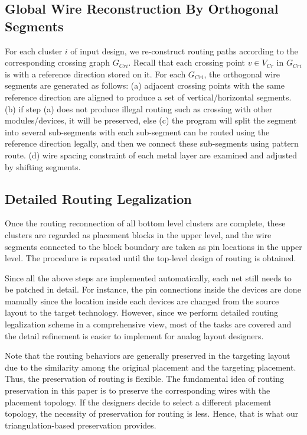     \subsection{Global Wire Reconstruction By Orthogonal Segments}\label{sec:GWRecon}
      For each cluster $i$ of input design, we re-construct routing paths according to the corresponding crossing graph $G_{Cri}$.
      Recall that each crossing point $v \in V_{Cr}$ in $G_{Cri}$ is with a reference direction stored on it.
      For each $G_{Cri}$, the orthogonal wire segments are generated as follows:
      (a) adjacent crossing points with the same reference direction are aligned to produce a set of vertical/horizontal segments.
      (b) if step (a) does not produce illegal routing such as crossing with other modules/devices, it will be preserved, else
      (c) the program will split the segment into several sub-segments with each sub-segment can be routed using the reference direction legally, and then we connect these sub-segments using pattern route.
      (d) wire spacing constraint of each metal layer are examined and adjusted by shifting segments.


    \subsection{Detailed Routing Legalization}\label{sec:DRLegal}
      Once the routing reconnection of all bottom level clusters are complete, 
      these clusters are regarded as placement blocks in the upper level,
      and the wire segments connected to the block boundary are taken as pin locations in the upper level.
      The procedure is repeated until the top-level design of routing is obtained.

    Since all the above steps are implemented automatically, each net still needs to be patched in detail. For instance, the pin connections inside the devices are done manually since the location inside each devices are changed from the source layout to the target technology. 
    However, since we perform detailed routing legalization scheme in a comprehensive view, most of the tasks are covered and the detail refinement is easier to implement for analog layout designers.
  
  Note that the routing behaviors are generally preserved in the targeting layout due to the similarity among the original placement and the targeting placement. Thus, the preservation of routing is flexible. The fundamental idea of routing preservation in this paper is to preserve the corresponding wires with the placement topology. If the designers decide to select a different placement topology, the necessity of preservation for routing is less. Hence, that is what our triangulation-based preservation provides.


